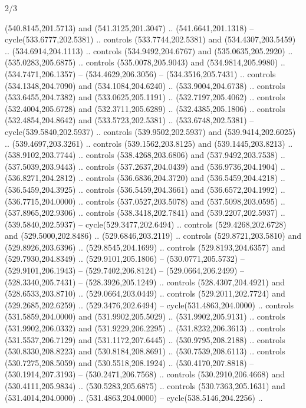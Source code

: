 \begin{flagdescription}{2/3}
\begin{scope}[xshift=0.5\flaglength,yshift=0.5\flagwidth,scale=\flagwidth/495.65]
\begin{scope}[y=0.8pt, x=0.8pt, yscale=-1,shift={(-463.76,-309.78)}]
  (540.8145,201.5713) and (541.3125,201.3047) .. (541.6641,201.1318) --
  cycle(533.6777,202.5381) .. controls (533.7744,202.5381) and
  (534.4307,203.5459) .. (534.6914,204.1113) .. controls (534.9492,204.6767) and
  (535.0635,205.2920) .. (535.0283,205.6875) .. controls (535.0078,205.9043) and
  (534.9814,205.9980) .. (534.7471,206.1357) -- (534.4629,206.3056) --
  (534.3516,205.7431) .. controls (534.1348,204.7090) and (534.1084,204.6240) ..
  (533.9004,204.6738) .. controls (533.6455,204.7382) and (533.0625,205.1191) ..
  (532.7197,205.4062) .. controls (532.4004,205.6728) and (532.3711,205.6289) ..
  (532.4385,205.1806) .. controls (532.4854,204.8642) and (533.5723,202.5381) ..
  (533.6748,202.5381) -- cycle(539.5840,202.5937) .. controls
  (539.9502,202.5937) and (539.9414,202.6025) .. (539.4697,203.3261) .. controls
  (539.1562,203.8125) and (539.1445,203.8213) .. (538.9102,203.7744) .. controls
  (538.4268,203.6806) and (537.9492,203.7538) .. (537.5039,203.9443) .. controls
  (537.2637,204.0439) and (536.9736,204.1904) .. (536.8271,204.2812) .. controls
  (536.6836,204.3720) and (536.5459,204.4218) .. (536.5459,204.3925) .. controls
  (536.5459,204.3661) and (536.6572,204.1992) .. (536.7715,204.0000) .. controls
  (537.0527,203.5078) and (537.5098,203.0595) .. (537.8965,202.9306) .. controls
  (538.3418,202.7841) and (539.2207,202.5937) .. (539.5840,202.5937) --
  cycle(529.3477,202.6494) .. controls (529.4268,202.6728) and
  (529.5000,202.8486) .. (529.6846,203.2119) .. controls (529.8721,203.5810) and
  (529.8926,203.6396) .. (529.8545,204.1699) .. controls (529.8193,204.6357) and
  (529.7930,204.8349) .. (529.9101,205.1806) -- (530.0771,205.5732) --
  (529.9101,206.1943) -- (529.7402,206.8124) -- (529.0664,206.2499) --
  (528.3340,205.7431) -- (528.3926,205.1249) .. controls (528.4307,204.4921) and
  (528.6533,203.8710) .. (529.0664,203.0449) .. controls (529.2011,202.7724) and
  (529.2685,202.6259) .. (529.3476,202.6494) -- cycle(531.4863,204.0000) ..
  controls (531.5859,204.0000) and (531.9902,205.5029) .. (531.9902,205.9131) ..
  controls (531.9902,206.0332) and (531.9229,206.2295) .. (531.8232,206.3613) ..
  controls (531.5537,206.7129) and (531.1172,207.6445) .. (530.9795,208.2188) ..
  controls (530.8330,208.8223) and (530.8184,208.8691) .. (530.7539,208.6113) ..
  controls (530.7275,208.5059) and (530.5518,208.1924) .. (530.4170,207.8818) --
  (530.1914,207.3193) -- (530.2471,206.7568) .. controls (530.2910,206.4668) and
  (530.4111,205.9834) .. (530.5283,205.6875) .. controls (530.7363,205.1631) and
  (531.4014,204.0000) .. (531.4863,204.0000) -- cycle(538.5146,204.2256) ..

\end{scope}
\end{scope}
\end{flagdescription}
